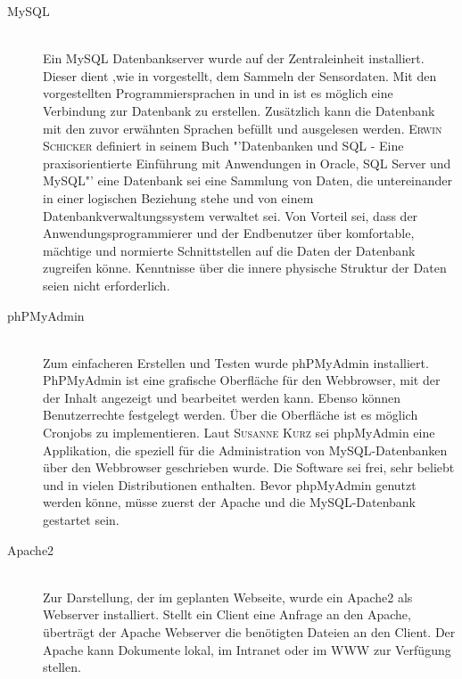 \begin{description}
	\item[MySQL] \hfill \\
	Ein MySQL Datenbankserver wurde auf der Zentraleinheit installiert. Dieser dient ,wie in  vorgestellt, dem Sammeln der Sensordaten. Mit den vorgestellten Programmiersprachen in  und in  ist es möglich eine Verbindung zur Datenbank zu erstellen. Zusätzlich kann die Datenbank mit den zuvor erwähnten Sprachen befüllt und ausgelesen werden.
	\textsc{Erwin Schicker} definiert in seinem Buch "'Datenbanken und SQL - Eine praxisorientierte Einführung mit Anwendungen in Oracle, SQL Server und MySQL"'\cite{schicker2017datenbanken} eine Datenbank sei eine Sammlung von Daten, die untereinander in einer logischen Beziehung stehe und von einem Datenbankverwaltungssystem verwaltet sei. Von Vorteil sei, dass der Anwendungsprogrammierer und der Endbenutzer über komfortable, mächtige und normierte Schnittstellen auf die Daten der Datenbank zugreifen könne. Kenntnisse über die innere physische Struktur der Daten seien nicht erforderlich.

	\item[phPMyAdmin] \hfill \\
	Zum einfacheren Erstellen und Testen wurde phPMyAdmin installiert. PhPMyAdmin ist eine grafische Oberfläche für den Webbrowser, mit der der Inhalt angezeigt und bearbeitet werden kann. Ebenso können Benutzerrechte festgelegt werden. Über die Oberfläche ist es möglich Cronjobs zu implementieren.
	Laut \textsc{Susanne Kurz} \cite{kurz2016digital} sei phpMyAdmin eine Applikation, die speziell für die Administration von MySQL-Datenbanken über den Webbrowser geschrieben wurde. Die Software sei frei, sehr beliebt und in vielen Distributionen enthalten. Bevor phpMyAdmin genutzt werden könne, müsse zuerst der Apache und die MySQL-Datenbank gestartet sein.

	\item[Apache2] \hfill \\
	Zur Darstellung, der im  geplanten Webseite, wurde ein Apache2 als Webserver installiert. Stellt ein Client eine Anfrage an den Apache, überträgt der Apache Webserver die benötigten Dateien an den Client. Der Apache kann Dokumente lokal, im Intranet oder im WWW zur Verfügung stellen.

\end{description}
